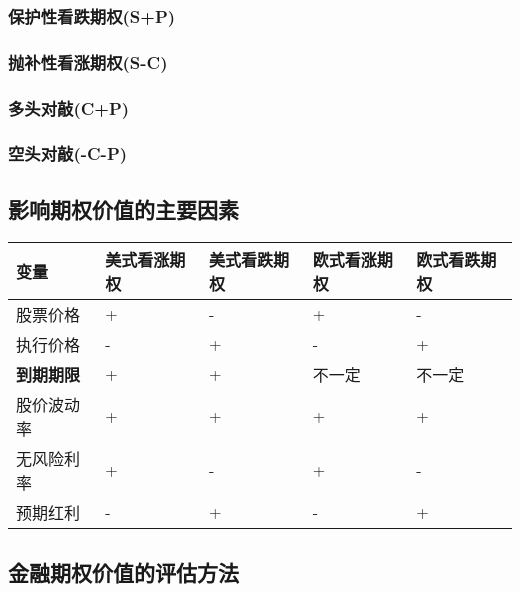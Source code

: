 \documentclass[11pt]{article}
\begin{document}
\subsubsection{保护性看跌期权(S+P)}
\label{sec:org30b3e28}
\subsubsection{抛补性看涨期权(S-C)}
\label{sec:org72c5279}
\subsubsection{多头对敲(C+P)}
\label{sec:orgae48246}
\subsubsection{空头对敲(-C-P)}
\label{sec:orgeb375b0}
\subsection{影响期权价值的主要因素}
\label{sec:org833f905}
\begin{center}
\begin{tabular}{lllll}
变量 & 美式看涨期权 & 美式看跌期权 & 欧式看涨期权 & 欧式看跌期权\\
\hline
股票价格 & + & - & + & -\\
执行价格 & - & + & - & +\\
\textbf{到期期限} & + & + & 不一定 & 不一定\\
股价波动率 & + & + & + & +\\
无风险利率 & + & - & + & -\\
预期红利 & - & + & - & +\\
\end{tabular}
\end{center}
\subsection{金融期权价值的评估方法}
\label{sec:orgc1b4a07}
\end{document}
